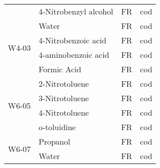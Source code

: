 \begin{table}[]
\begin{tabular}{@{}llll@{}}
                       & 4-Nitrobenzyl alcohol   & FR                                                                 & cod                                                         \\
\multirow{4}{*}{W4-03} & Water                   & FR                                                                 & cod                                                         \\
                       & 4-Nitrobenzoic acid     & FR                                                                 & cod                                                         \\
                       & 4-aminobenzoic acid     & FR                                                                 & cod                                                         \\
                       & Formic Acid             & FR                                                                 & cod                                                         \\
\multirow{4}{*}{W6-05} & 2-Nitrotoluene          & FR                                                                 & cod                                                         \\
                       & 3-Nitrotoluene          & FR                                                                 & cod                                                         \\
                       & 4-Nitrotoluene          & FR                                                                 & cod                                                         \\
                       & o-toluidine             & FR                                                                 & cod                                                         \\
\multirow{2}{*}{W6-07} & Propanol                & FR                                                                 & cod                                                         \\
                       & Water                   & FR                                                                 & cod                                                         \\ \cmidrule(l){2-4} 
\end{tabular}
\end{table}


